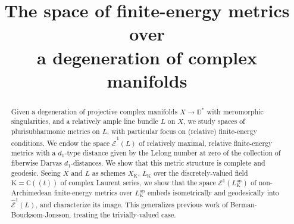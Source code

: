 \documentclass[JEP,XML,SOM,Unicode,NoEqCountersInSection,published]{cedram}
\theoremstyle{definition}
\begin{document}
\frontmatter
\title[The space of finite-energy metrics over a degeneration of complex manifolds]{The space of finite-energy metrics over\\ a degeneration of complex manifolds}

\author[\initial{R.} \lastname{Reboulet}]{ }
\address{Department of mathematical sciences, Chalmers University of Technology\\
412 96 Gothenburg, Sweden}

\begin{abstract}
Given a degeneration of projective complex manifolds $X\to \mathbb{D}^*$ with meromorphic singularities, and a relatively ample line bundle $L$ on $X$, we study spaces of plurisubharmonic metrics on $L$, with particular focus on (relative) finite-energy conditions. We endow the space $\hat {\mathcal{E}}^1(L)$ of relatively maximal, relative finite-energy metrics with a $d_1$-type distance given by the Lelong number at zero of the collection of fiberwise Darvas $d_1$-distances. We show that this metric structure is complete and geodesic. Seeing $X$ and $L$ as schemes $X_{\mathrm{K}}$, $L_{\mathrm{K}}$ over the discretely-valued field $\mathrm{K}=\mathbb{C}(\!(t)\!)$ of complex Laurent series, we show that the space $\mathcal{E}^1(L_{\mathrm{K}}^{\mathrm{an}})$ of non-Archimedean finite-energy metrics over $L_{\mathrm{K}}^{\mathrm{an}}$ embeds isometrically and geodesically into $\hat {\mathcal{E}}^1(L)$, and characterize its image. This generalizes previous work of Berman-Boucksom-Jonsson, treating the trivially-valued case.
\end{abstract}




\end{document}
